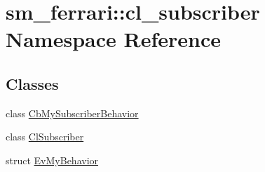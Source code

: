 \hypertarget{namespacesm__ferrari_1_1cl__subscriber}{}\section{sm\+\_\+ferrari\+:\+:cl\+\_\+subscriber Namespace Reference}
\label{namespacesm__ferrari_1_1cl__subscriber}
\subsection*{Classes}
\begin{DoxyCompactItemize}
\item 
class \hyperlink{classsm__ferrari_1_1cl__subscriber_1_1CbMySubscriberBehavior}{Cb\+My\+Subscriber\+Behavior}
\item 
class \hyperlink{classsm__ferrari_1_1cl__subscriber_1_1ClSubscriber}{Cl\+Subscriber}
\item 
struct \hyperlink{structsm__ferrari_1_1cl__subscriber_1_1EvMyBehavior}{Ev\+My\+Behavior}
\end{DoxyCompactItemize}
